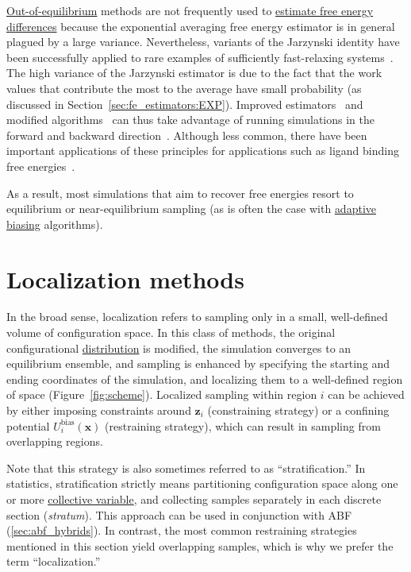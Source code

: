 \documentclass[9pt,review]{livecoms}
\newcommand{\vx}{\mathbf{x}}
\newcommand{\vz}{\mathbf{z}}
\begin{document}
\hyperlink{ref:OutOfEq} {Out-of-equilibrium} methods are not frequently used to \hyperlink{ref:FEestimator} {estimate free energy differences} because the exponential averaging free energy estimator is in general plagued by a large variance.
Nevertheless, variants of the Jarzynski identity have been successfully applied to rare examples of sufficiently fast-relaxing systems~\cite{park-khalili-araghi-tajkhorshid-schulten-03}.
The high variance of the Jarzynski estimator is due to the fact that the work values that contribute the most to the average have small probability (as discussed in Section~\ref{sec:fe_estimators:EXP}).
Improved estimators~\cite{minh-adlib-08} and modified algorithms~\cite{VJ08,hartmann-schuette-zhang-19,rousset2006equilibrium} can thus take advantage of running simulations in the forward and backward direction~\cite{hummer-07}. Although less common, there have been important applications of these principles for applications such as ligand binding free energies~\citep{alchemy_Gapsys_2020}.


As a result, most simulations that aim to recover free energies resort to equilibrium or near-equilibrium sampling (as is often the case with \hyperlink{ref:Adaptive} {adaptive} \hyperlink{ref:biasingE} {biasing} algorithms).


\section{Localization methods}
\label{sec:localization}

In the broad sense, localization refers to sampling only in a small, well-defined volume of configuration space. In this class of methods, the original configurational \hyperlink{ref:Distribution}{distribution} is modified, the simulation converges to an equilibrium ensemble, and sampling is enhanced by specifying the starting and ending coordinates of the simulation, and localizing them to a well-defined region of space (Figure~\ref{fig:scheme}). Localized sampling within region $i$ can be achieved by either imposing constraints around $\vz_i$ (constraining strategy) or a confining potential $U^{\mathrm{bias}}_i(\vx)$ (restraining strategy), which can result in sampling from overlapping regions.

Note that this strategy is also sometimes referred to as ``stratification.'' In statistics, stratification strictly means partitioning configuration space along one or more \hyperlink{ref:CV} {collective variable}, and collecting samples separately in each discrete section (\textit{stratum}). This approach can be used in conjunction with ABF (\ref{sec:abf_hybrids}).
In contrast, the most common restraining strategies mentioned in this section yield overlapping samples, which is why we prefer the term ``localization.''
\end{document}
